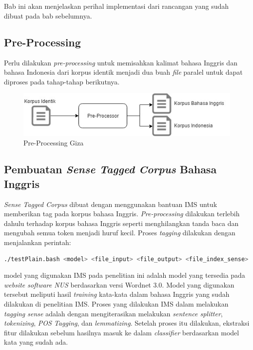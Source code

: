 \chapter{\babEmpat} \label{implementasi}
Bab ini akan menjelaskan perihal implementasi dari rancangan yang sudah dibuat pada bab sebelumnya.

\section{Pre-Processing}
Perlu dilakukan \textit{pre-processing} untuk memisahkan kalimat bahasa Inggris dan bahasa Indonesia dari korpus identik menjadi dua buah \textit{file} paralel untuk dapat diproses pada tahap-tahap berikutnya.

\begin{figure}
	\centering
	\includegraphics[width=1\linewidth]{adit_pics/pre-process-giza}
	\caption{Pre-Processing Giza}
	\label{fig:Pre-Processing-Giza}
\end{figure}


\section{Pembuatan \textit{Sense Tagged Corpus} Bahasa Inggris}
\textit{Sense Tagged Corpus} dibuat dengan menggunakan bantuan IMS untuk memberikan tag pada korpus bahasa Inggris. \textit{Pre-processing} dilakukan terlebih dahulu terhadap korpus bahasa Inggris seperti menghilangkan tanda baca dan mengubah semua token menjadi huruf kecil. Proses \textit{tagging} dilakukan dengan menjalankan perintah:

\begin{lstlisting}[language=bash, caption={IMS}, label={IMS}]
./testPlain.bash <model> <file_input> <file_output> <file_index_sense>
\end{lstlisting}

model yang digunakan IMS pada penelitian ini adalah model yang tersedia pada \textit{website software NUS} berdasarkan versi Wordnet 3.0. Model yang digunakan tersebut meliputi hasil \textit{training} kata-kata dalam bahasa Inggris yang sudah dilakukan di penelitian IMS. Proses yang dilakukan IMS dalam melakukan \textit{tagging sense} adalah dengan mengiterasikan melakukan \textit{sentence splitter}, \textit{tokenizing}, \textit{POS Tagging}, dan \textit{lemmatizing}. Setelah proses itu dilakukan, ekstraksi fitur dilakukan sebelum hasilnya masuk ke dalam \textit{classifier} berdasarkan model kata yang sudah ada. 


